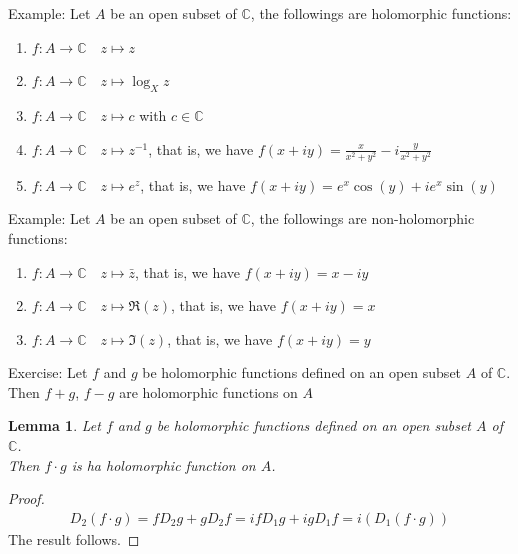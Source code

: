 \documentclass[11pt,oneside]{book}
\theoremstyle{break}
\theoremstyle{break}
\newtheorem{lem}{Lemma}[thm]
\newcommand{\Complex}{\mathbb{C}}
\newcommand{\example}{\color{green}Example: \color{black}}
\newcommand{\exercise}{\color{green}Exercise: \color{black}}
\begin{document}
\hfill\break

\example
Let $A$ be an open subset of $\Complex$, the followings are holomorphic functions:
\begin{enumerate}[topsep=3pt,itemsep=-1ex,partopsep=1ex,parsep=1ex]
\item $f:A \to \Complex  \quad z\mapsto z$
\item $f:A \to \Complex  \quad z\mapsto \log_X z$
\item $f:A \to \Complex  \quad z\mapsto c$ with $c \in \Complex$
\item $f:A \to \Complex  \quad z\mapsto z^{-1}$, that is, we have $f(x+iy) = \frac{x}{x^2 + y^2}-i\frac{y}{x^2 + y^2}$
\item $f:A \to \Complex  \quad z\mapsto e^z$, that is, we have $f(x+iy) = e^x \cos(y) + ie^x \sin(y)$
\end{enumerate}

\example
Let $A$ be an open subset of $\Complex$, the followings are non-holomorphic functions:
\begin{enumerate}[topsep=3pt,itemsep=-1ex,partopsep=1ex,parsep=1ex]
\item $f:A \to \Complex  \quad z\mapsto \bar{z}$, that is, we have $f(x+iy) = x-iy$
\item $f:A \to \Complex  \quad z\mapsto  \Re(z)$, that is, we have $f(x+iy) = x$
\item $f:A \to \Complex  \quad z\mapsto  \Im(z)$, that is, we have $f(x+iy) = y$\\
\end{enumerate}

\exercise Let $f$ and $g$ be holomorphic functions defined on an open subset $A$ of $\Complex$. \\
Then $f+g$, $f-g$ are holomorphic functions on $A$\\

\newpage
\begin{lem}
Let $f$ and $g$ be holomorphic functions defined on an open subset $A$ of $\Complex$. \\
Then $f\cdot g$ is ha holomorphic function on $A$.
\end{lem}
\begin{proof}
\begin{align*}
D_2(f\cdot g) = fD_2 g + gD_2 f = ifD_1 g+ igD_1 f = i(D_1(f\cdot g))
\end{align*}
The result follows.
\end{proof}
\end{document}
